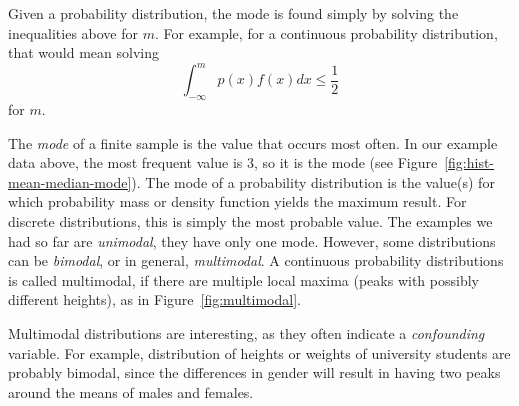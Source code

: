 Given a probability distribution,
the mode is found simply by solving the inequalities above for $m$.
For example, for a continuous probability distribution,
that would mean solving
\[
  \int_{-\infty}^{m} p(x) f(x) dx \le \frac{1}{2}
\]
for $m$.

The \emph{mode} of a finite sample is the value that occurs most often.
In our example data above,
the most frequent value is \num{3},
so it is the mode (see Figure~\ref{fig:hist-mean-median-mode}).
The mode of a probability distribution is
the value(s) for which probability mass or density function yields
the maximum result.
For discrete distributions,
this is simply the most probable value.
The examples we had so far are \emph{unimodal},
they have only one mode.
However, some distributions can be \emph{bimodal},
or in general, \emph{multimodal}.
A continuous probability distributions is called multimodal,
if there are multiple local maxima
(peaks with possibly different heights),
as in Figure~\ref{fig:multimodal}.
\begin{marginfigure}
  \caption{\label{fig:multimodal}%
    An example multimodal (bimodal) continuous probability distribution.
  }
\end{marginfigure}
Multimodal distributions are interesting,
as they often indicate a \emph{confounding} variable.
For example,
distribution of heights or weights of university students are
probably bimodal,
since the differences in gender will result in having
two peaks around the means of males and females.


